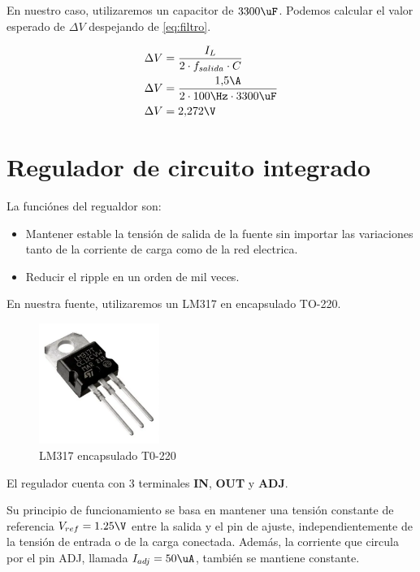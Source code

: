 En nuestro caso, utilizaremos un capacitor de $3300\uF$. Podemos calcular el valor esperado de $\Delta V$ despejando de \ref{eq:filtro}.

\begin{equation}
  \begin{aligned}
    \Delta V&=\frac{I_L}{2 \cdot f_{salida} \cdot C}\\
    \Delta V&=\frac{1{,}5\A}{2 \cdot 100\Hz \cdot 3300\uF}\\
    \Delta V&= 2{,}272 \V
  \end{aligned}
\end{equation}

\section{Regulador de circuito integrado}
La funciónes del regualdor son:

\begin{itemize}
  \item Mantener estable la tensión de salida de la fuente sin importar las variaciones tanto de la corriente de carga como de la red electrica.
  \item Reducir el ripple en un orden de mil veces.
\end{itemize}

En nuestra fuente, utilizaremos un LM317 en encapsulado TO-220.

\begin{figure}[h]
  \centering
  \includegraphics[width=0.35\textwidth]{images/LM317-TO220.png}
  \caption{LM317 encapsulado T0-220}
\end{figure}

El regulador cuenta con 3 terminales \textbf{IN}, \textbf{OUT} y \textbf{ADJ}.

Su principio de funcionamiento se basa en mantener una tensión constante de referencia $V_{ref} = 1.25\V$ entre la salida y el pin de ajuste, independientemente
de la tensión de entrada o de la carga conectada. Además, la corriente que circula por el pin ADJ, llamada $I_{adj} = 50 \uA$, también se mantiene constante.

